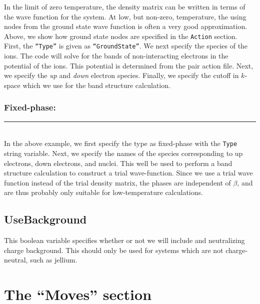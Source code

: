 \documentclass{book}
\begin{document}
In the limit of zero temperature, the density matrix can be written in
terms of the wave function for the system.  At low, but non-zero,
temperature, the using nodes from the ground state wave function is
often a very good approximation.  Above, we show how ground state
nodes are specified in the \texttt{Action} section.  First, the
\texttt{``Type''} is given as \texttt{``GroundState''}.  We next
specify the species of the ions.  The code will solve for the bands of
non-interacting electrons in the potential of the ions.  This
potential is determined from the pair action file.  Next, we specify
the {\em up} and {\em down} electron species.  Finally, we specify the
cutoff in $k$-space which we use for the band structure calculation.

\subsubsection{Fixed-phase:}
\rule{0.0cm}{0.75cm}\rule{0.6cm}{0cm}\\
In the above example, we first specify the type as fixed-phase with
the \texttt{Type} string variable.  Next, we specify the names of the
species corresponding to up electrons, down electrons, and nuclei.
This well be used to perform a band structure calculation to construct
a trial wave-function.  Since we use a trial wave function instead of
the trial density matrix, the phases are independent of $\beta$, and
are thus probably only suitable for low-temperature calculations.

\subsection{UseBackground}
This boolean variable specifies whether or not we will include and
neutralizing charge background.  This should only be used for systems
which are not charge-neutral, such as jellium.

\section{The ``Moves'' section}
\end{document}
